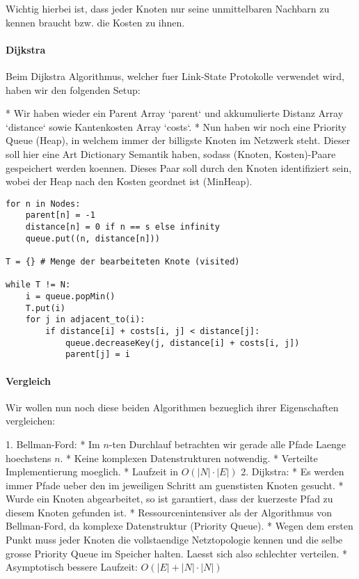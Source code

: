 Wichtig hierbei ist, dass jeder Knoten nur seine unmittelbaren Nachbarn zu
kennen braucht bzw. die Kosten zu ihnen.

\paragraph{Dijkstra} 

Beim Dijkstra Algorithmus, welcher fuer Link-State Protokolle verwendet wird,
haben wir den folgenden Setup:

* Wir haben wieder ein Parent Array `parent` und akkumulierte Distanz Array
  `distance` sowie Kantenkosten Array `costs`.
* Nun haben wir noch eine Priority Queue (Heap), in welchem immer der billigste
  Knoten im Netzwerk steht. Dieser soll hier eine Art Dictionary Semantik haben,
  sodass (Knoten, Kosten)-Paare gespeichert werden koennen. Dieses Paar soll
  durch den Knoten identifiziert sein, wobei der Heap nach den Kosten geordnet
  ist (MinHeap).

\begin{verbatim}
for n in Nodes:
	parent[n] = -1
	distance[n] = 0 if n == s else infinity
	queue.put((n, distance[n]))

T = {} # Menge der bearbeiteten Knote (visited)

while T != N:
	i = queue.popMin()
	T.put(i)
	for j in adjacent_to(i):
		if distance[i] + costs[i, j] < distance[j]:
			queue.decreaseKey(j, distance[i] + costs[i, j])
			parent[j] = i
\end{verbatim}

\paragraph{Vergleich} 

Wir wollen nun noch diese beiden Algorithmen bezueglich ihrer Eigenschaften
vergleichen:

1. Bellman-Ford:
   * Im $n$-ten Durchlauf betrachten wir gerade alle Pfade Laenge hoechstens
     $n$.
   * Keine komplexen Datenstrukturen notwendig.
   * Verteilte Implementierung moeglich.
   * Laufzeit in $O(|N| \cdot |E|)$
2. Dijkstra:
   * Es werden immer Pfade ueber den im jeweiligen Schritt am guenstisten Knoten
     gesucht.
   * Wurde ein Knoten abgearbeitet, so ist garantiert, dass der kuerzeste Pfad
     zu diesem Knoten gefunden ist.
   * Ressourcenintensiver als der Algorithmus von Bellman-Ford, da komplexe
     Datenstruktur (Priority Queue).
   * Wegen dem ersten Punkt muss jeder Knoten die vollstaendige Netztopologie
     kennen und die selbe grosse Priority Queue im Speicher halten. Laesst sich
     also schlechter verteilen.
   * Asymptotisch bessere Laufzeit: $O(|E| + |N| \cdot |N|)$

